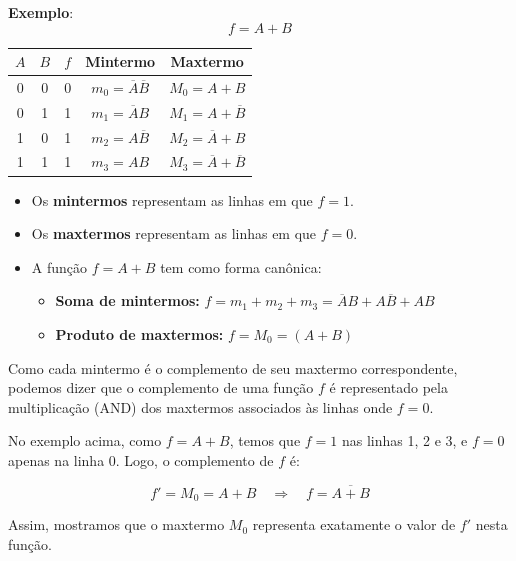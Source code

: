 \documentclass[12pt]{article}
\begin{document}
\vspace{0.5cm}

\textbf{Exemplo}:
\[
f = A + B
\]

\begin{center}
\begin{tabular}{|c|c|c|c|c|}
\hline
$A$  & $B$ & $f$ & Mintermo & Maxtermo \\
\hline
0 & 0 & 0 & $m_0 = \overline{A}\overline{B}$ & $M_0 = A + B$ \\
0 & 1 & 1 & $m_1 = \overline{A}B$            & $M_1 = A + \overline{B}$ \\
1 & 0 & 1 & $m_2 = A\overline{B}$            & $M_2 = \overline{A} + B$ \\
1 & 1 & 1 & $m_3 = AB$                       & $M_3 = \overline{A} + \overline{B}$ \\
\hline
\end{tabular}
\end{center}

\begin{itemize}
   \item Os \textbf{mintermos} representam as linhas em que $f = 1$.
   \item Os \textbf{maxtermos} representam as linhas em que $f = 0$.
   \item A função $f = A + B$ tem como forma canônica:
   \begin{itemize}
      \item \textbf{Soma de mintermos:} $f = m_1 + m_2 + m_3 = \overline{A}B + A\overline{B} + AB$
      \item \textbf{Produto de maxtermos:} $f = M_0 = (A + B)$
   \end{itemize}
\end{itemize}

\begin{tcolorbox}[mynote, title={\textbf{Mintermos, Maxtermos e Complemento}}]
Como cada mintermo é o complemento de seu maxtermo correspondente, podemos dizer que o complemento de uma função $f$ é representado pela multiplicação (AND) dos maxtermos associados às linhas onde $f = 0$.

No exemplo acima, como $f = A + B$, temos que $f = 1$ nas linhas 1, 2 e 3, e $f = 0$ apenas na linha 0. Logo, o complemento de $f$ é:

\[
f' = M_0 = A + B
\quad \Rightarrow \quad f = \overline{A + B}
\]

Assim, mostramos que o maxtermo $M_0$ representa exatamente o valor de $f'$ nesta função.
\end{tcolorbox}
\end{document}
